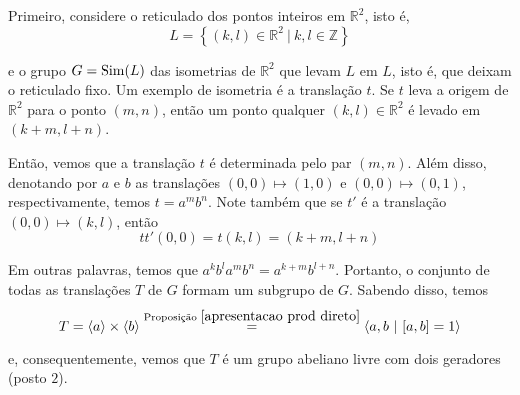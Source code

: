     	\par\vspace{0.3cm} Primeiro, considere o reticulado dos pontos inteiros em $\mathbb{R}^2$, isto é,
    	\begin{equation*}
    	    L = \left\{ (k,l)\in\mathbb{R}^2 \ | \ k,l\in\mathbb{Z} \right\}
    	\end{equation*}
    	\par\vspace{0.3cm} e o grupo $G = \operatorname{Sim}(L)$ das isometrias de $\mathbb{R}^2$ que levam $L$ em $L$, 
    	isto é, que deixam o reticulado fixo. Um exemplo de isometria é a translação $t$. Se $t$ leva a 
    	origem de $\mathbb{R}^2$ para o ponto $(m,n)$, então um ponto qualquer $(k,l)\in\mathbb{R}^2$ é 
    	levado em $(k+m, l+n)$.
    	
    	\par\vspace{0.3cm} Então, vemos que a translação $t$ é determinada pelo par $(m,n)$. Além disso, 
    	denotando por $a$ e $b$ as translações $(0,0)\mapsto (1,0)$ e $(0,0)\mapsto(0,1)$, respectivamente, 
    	temos $t = a^mb^n$. Note também que se $t'$ é a translação $(0,0)\mapsto(k,l)$, então 
    	\begin{equation*}
    	    tt'(0,0) = t(k,l) = (k+m, l+n)
    	\end{equation*}
    	\par\vspace{0.3cm} Em outras palavras, temos que $a^kb^la^mb^n = a^{k+m}b^{l+n}$. Portanto, o 
    	conjunto de todas as translações $T$ de $G$ formam um subgrupo de $G$. Sabendo disso, temos
    	\begin{equation*}
    	    T = \langle a \rangle \times \langle b \rangle \stackrel{\text{Proposição }
    	    \eqref{apresentacao prod direto}}{=} \langle a,b \ | \ [a,b]=1 \rangle 
    	\end{equation*} 
    	\par\vspace{0.3cm} e, consequentemente, vemos que $T$ é um grupo abeliano livre com dois geradores 
    	(posto $2$).
    	
